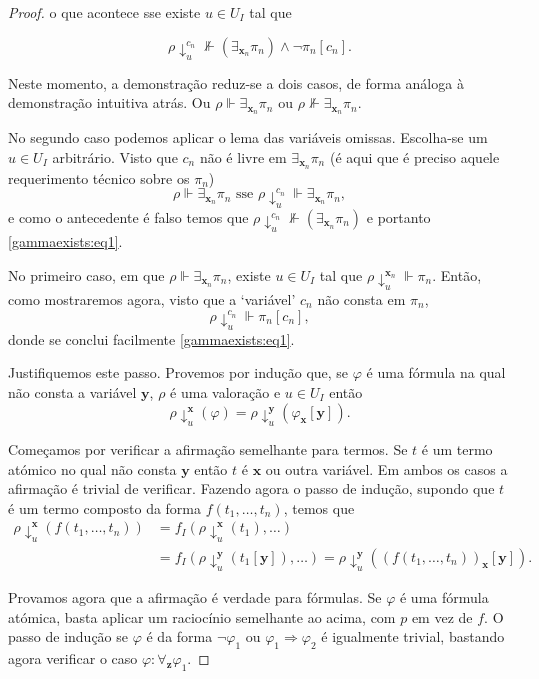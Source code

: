 \documentclass{report}
\theoremstyle{definition}
\theoremstyle{remark}
\renewcommand{\bf}[1]{\mathbf{#1}}
\newcommand{\imply}{\mathbin{\Rightarrow}}
\begin{document}
\begin{proof}
	o que acontece sse existe $u \in U_I$ tal que
	
	\begin{equation}\label{gammaexists:eq1}
	\rho\!\downarrow^{c_n}_u \nVdash (\exists_{\bf x_n} \pi_n) \land \neg \pi_n[c_n].
	\end{equation}
	
	Neste momento, a demonstração reduz-se a dois casos, de forma análoga à demonstração intuitiva atrás. Ou $\rho \Vdash \exists_{\bf x_n} \pi_n$ ou $\rho \nVdash \exists_{\bf x_n} \pi_n$.
	
	No segundo caso podemos aplicar o lema das variáveis omissas. Escolha-se um $u \in U_I$ arbitrário. Visto que $c_n$ não é livre em $\exists_{\bf x_n} \pi_n$ (é aqui que é preciso aquele requerimento técnico sobre os $\pi_n$)
	\[\rho \Vdash \exists_{\bf x_n} \pi_n \text{ sse } \rho\!\downarrow^{c_n}_u \Vdash \exists_{\bf x_n} \pi_n, \]
	e como o antecedente é falso temos que $\rho\!\downarrow^{c_n}_u \nVdash (\exists_{\bf x_n} \pi_n)$ e portanto \eqref{gammaexists:eq1}.
	
	No primeiro caso, em que $\rho \Vdash \exists_{\bf x_n} \pi_n$, existe $u \in U_I$ tal que $\rho\!\downarrow^{\bf x_n}_u \Vdash \pi_n$. Então, como mostraremos agora, visto que a `variável' $c_n$ não consta em $\pi_n$,
	\[\rho\!\downarrow^{c_n}_u \Vdash \pi_n[c_n],\]
	donde se conclui facilmente \eqref{gammaexists:eq1}.

	Justifiquemos este passo. Provemos por indução que, se $\varphi$ é uma fórmula na qual não consta a variável $\bf y$, $\rho$ é uma valoração e $u \in U_I$ então
\[ \rho\!\downarrow^{\bf x}_u(\varphi) = \rho\!\downarrow^{\bf y}_u (\varphi_{\bf x}[\bf y]).\]

	Começamos por verificar a afirmação semelhante para termos. Se $t$ é um termo atómico no qual não consta $\bf y$ então $t$ é $\bf x$ ou outra variável. Em ambos os casos a afirmação é trivial de verificar. Fazendo agora o passo de indução, supondo que $t$ é um termo composto da forma $f(t_1, \dots, t_n)$, temos que
\begin{align*}
\rho\!\downarrow^{\bf x}_u(f(t_1, \dots, t_n)) &= f_I(\rho\!\downarrow^{\bf x}_u(t_1), \dots)\\
&= f_I(\rho\!\downarrow^{\bf y}_u(t_1[\bf y]), \dots) = \rho\!\downarrow^{\bf y}_u\left((f(t_1, \dots, t_n))_{\bf x}[\bf y]\right).
\end{align*}

	Provamos agora que a afirmação é verdade para fórmulas. Se $\varphi$ é uma fórmula atómica, basta aplicar um raciocínio semelhante ao acima, com $p$ em vez de $f$. O passo de indução se $\varphi$ é da forma $\neg \varphi_1$ ou $\varphi_1 \imply \varphi_2$ é igualmente trivial, bastando agora verificar o caso $\varphi : \forall_{\bf z} \varphi_1$.


\end{proof}
\end{document}
